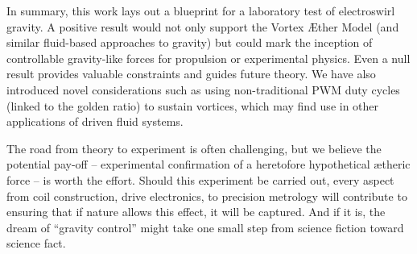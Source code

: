 \documentclass[twocolumn,aps,pre,floatfix,nofootinbib]{revtex4-2}
\begin{document}
In summary, this work lays out a blueprint for a laboratory test of electroswirl gravity. A positive result would not only support the Vortex Æther Model (and similar fluid-based approaches to gravity) but could mark the inception of controllable gravity-like forces for propulsion or experimental physics. Even a null result provides valuable constraints and guides future theory. We have also introduced novel considerations such as using non-traditional PWM duty cycles (linked to the golden ratio) to sustain vortices, which may find use in other applications of driven fluid systems.


The road from theory to experiment is often challenging, but we believe the potential pay-off – experimental confirmation of a heretofore hypothetical ætheric force – is worth the effort. Should this experiment be carried out, every aspect from coil construction, drive electronics, to precision metrology will contribute to ensuring that if nature allows this effect, it will be captured. And if it is, the dream of “gravity control” might take one small step from science fiction toward science fact.
\end{document}
